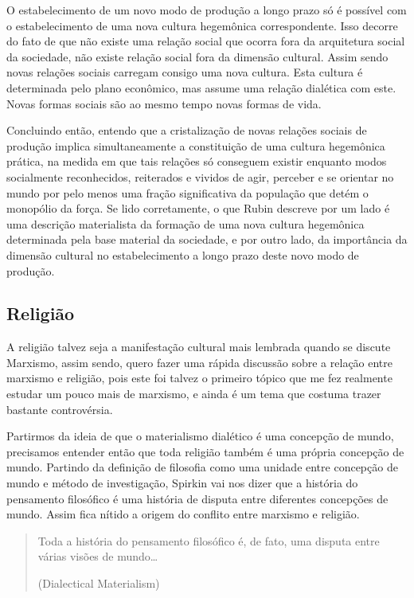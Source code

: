 O estabelecimento de um novo modo de produção a longo prazo só é possível com o estabelecimento de uma nova cultura hegemônica correspondente. Isso decorre do fato de que não existe uma relação social que ocorra fora da arquitetura social da sociedade, não existe relação social fora da dimensão cultural. Assim sendo novas relações sociais carregam consigo uma nova cultura. Esta cultura é determinada pelo plano econômico, mas assume uma relação dialética com este. Novas formas sociais são ao mesmo tempo novas formas de vida.

Concluindo então, entendo que a cristalização de novas relações sociais de produção implica simultaneamente a constituição de uma cultura hegemônica prática, na medida em que tais relações só conseguem existir enquanto modos socialmente reconhecidos, reiterados e vividos de agir, perceber e se orientar no mundo por pelo menos uma fração significativa da população que detém o monopólio da força. Se lido corretamente, o que Rubin descreve por um lado é uma descrição materialista da formação de uma nova cultura hegemônica determinada pela base material da sociedade, e por outro lado, da importância da dimensão cultural no estabelecimento a longo prazo deste novo modo de produção.

\subsection{Religião}

A religião talvez seja a manifestação cultural mais lembrada quando se discute Marxismo, assim sendo, quero fazer uma rápida discussão sobre a relação entre marxismo e religião, pois este foi talvez o primeiro tópico que me fez realmente estudar um pouco mais de marxismo, e ainda é um tema que costuma trazer bastante controvérsia. 

Partirmos da ideia de que o materialismo dialético é uma concepção de mundo, precisamos entender então que toda religião também é uma própria concepção de mundo. Partindo da definição de filosofia como uma unidade entre concepção de mundo e método de investigação, Spirkin vai nos dizer que a história do pensamento filosófico é uma história de disputa entre diferentes concepções de mundo. Assim fica nítido a origem do conflito entre marxismo e religião.

\begin{quote}
Toda a história do pensamento filosófico é, de fato, uma disputa entre várias visões de mundo…

(Dialectical Materialism)
\end{quote}

